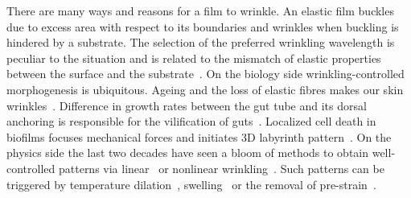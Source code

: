 \documentclass[twocolumn,superscriptaddress,showpacs,preprintnumbers,
amsmath,amssymb,prl]{revtex4-1}
\begin{document}

There are many ways and reasons for a film to wrinkle. An elastic film buckles due to excess area with respect to its boundaries and wrinkles when buckling is hindered by a substrate. The selection of the preferred wrinkling wavelength is peculiar to the situation and is related to the mismatch of elastic properties between the surface and the substrate~\cite{Gough1940, Bijlaard1946, Biot1957, Bowden1998, Cerda2003, Genzer2006}. On the biology side wrinkling-controlled morphogenesis is ubiquitous. Ageing and the loss of elastic fibres makes our skin wrinkles~\cite{Bissett1987, Genzer2006}. Difference in growth rates between the gut tube and its dorsal anchoring is responsible for the vilification of guts~\cite{Savin2011, Ciarletta2014, Shyer2013}. Localized cell death in biofilms focuses mechanical forces and initiates 3D labyrinth pattern~\cite{Trejo2013, Asally2012}. On the physics side the last two decades have seen a bloom of methods to obtain well-controlled patterns via linear~\cite{Bowden1998, Genzer2006, Hu1998, Kim2010, Vandeparre2011, Li2013} or nonlinear wrinkling~\cite{Efimenko2005, Guvendiren2010, Kim2011a, Brau2011}. Such patterns can be triggered by temperature dilation~\cite{Bowden1998}, swelling~\cite{Hu1998,Kim2010} or the removal of pre-strain~\cite{Genzer2006}. 
\end{document}
